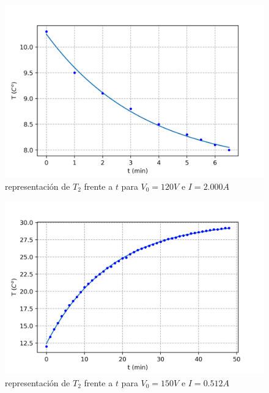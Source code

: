 \documentclass[12pt,a4paper]{article}
\begin{document}
\begin{figure}[h!] 	 \centering 
\includegraphics[scale=1.0]{plot-peltier3.png} 
\caption{representación de $T_2$ frente a $t$ para $V_0 = 120 V$ e $I = 2.000 A$} 
\label{Fig:graficapeltier4}
\end{figure} 

\begin{figure}[h!] 	 \centering 
\includegraphics[scale=1.0]{plot-peltier4.png} 
\caption{representación de $T_2$ frente a $t$ para $V_0 = 150 V$ e $I = 0.512 A$} 
\label{Fig:graficapeltier5}
\end{figure} 
\end{document}
